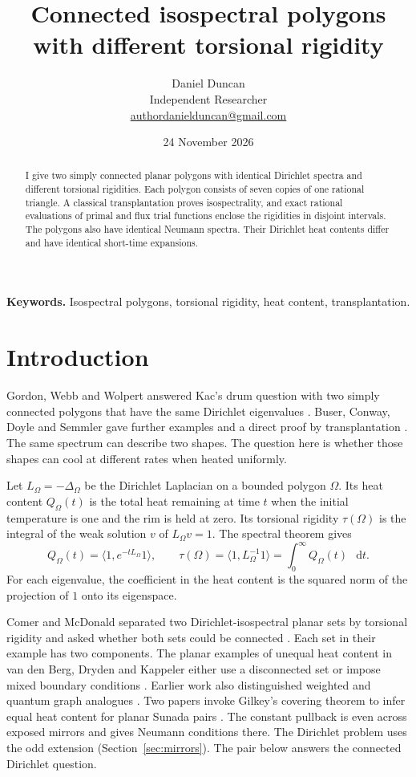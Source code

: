 \documentclass[11pt]{article}
\title{\textcolor{accent}{Connected isospectral polygons\\ with different torsional rigidity}}
\author{Daniel Duncan\\[2pt]
  \normalsize Independent Researcher\\
  \normalsize\href{mailto:authordanielduncan@gmail.com}{authordanielduncan@gmail.com}}
\date{24 November 2026}
\newcommand{\dd}{\mathop{}\!\mathrm{d}}
\begin{document}
\maketitle

\begin{abstract}
I give two simply connected planar polygons with identical Dirichlet spectra
and different torsional rigidities. Each polygon consists of seven copies of
one rational triangle. A classical transplantation proves isospectrality,
and exact rational evaluations of primal and flux trial functions enclose the
rigidities in disjoint intervals. The polygons also have identical Neumann
spectra. Their Dirichlet heat contents differ and have identical short-time
expansions.
\end{abstract}

\noindent\textbf{Keywords.} Isospectral polygons, torsional rigidity, heat
content, transplantation.

\section{Introduction}

Gordon, Webb and Wolpert answered Kac's drum question with two simply
connected polygons that have the same Dirichlet eigenvalues
\cite{kac,gww}. Buser, Conway, Doyle and Semmler gave further examples
and a direct proof by transplantation \cite{bcds}. The same spectrum
can describe two shapes. The question here is whether those shapes can
cool at different rates when heated uniformly.

Let $L_\Omega=-\Delta_\Omega$ be the Dirichlet Laplacian on a bounded
polygon $\Omega$. Its heat content $Q_\Omega(t)$ is the total heat
remaining at time $t$ when the initial temperature is one and the rim
is held at zero. Its torsional rigidity $\tau(\Omega)$ is the integral
of the weak solution $v$ of $L_\Omega v=1$. The spectral theorem gives
\begin{equation}\label{eq:heat-torsion}
 Q_\Omega(t)=\langle 1,e^{-tL_\Omega}1\rangle,\qquad
 \tau(\Omega)=\langle 1,L_\Omega^{-1}1\rangle
             =\int_0^\infty Q_\Omega(t)\,\dd t.
\end{equation}
For each eigenvalue, the coefficient in the heat content is the squared
norm of the projection of $1$ onto its eigenspace.

Comer and McDonald separated two Dirichlet-isospectral planar sets by
torsional rigidity and asked whether both sets could be connected
\cite[Theorem~1.1 and the paragraph following it]{cm}. Each set in their
example has two components. The planar examples of unequal heat content
in van den Berg, Dryden and Kappeler either use a disconnected set or
impose mixed boundary conditions \cite[Section~2]{bdk}. Earlier work
also distinguished weighted and quantum graph analogues \cite{mm,ckm}.
Two papers invoke Gilkey's covering theorem to infer equal heat
content for planar Sunada pairs \cite[Section~1]{cm,ckm}. The constant
pullback is even across exposed mirrors and gives Neumann conditions
there. The Dirichlet problem uses the odd extension
(Section~\ref{sec:mirrors}). The pair below answers the connected Dirichlet
question.
\end{document}

